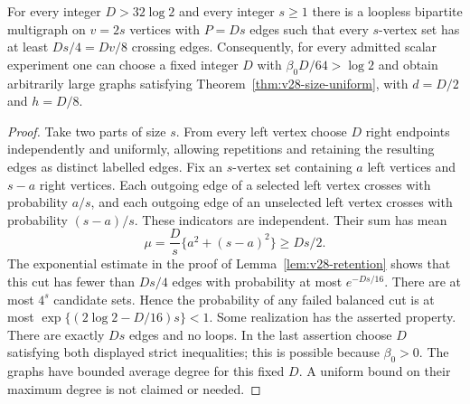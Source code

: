 \begin{proposition}
\label{prop:v28-graph-existence}
For every integer $D>32\log 2$ and every integer $s\ge1$ there is a
loopless bipartite multigraph on $v=2s$ vertices with $P=Ds$ edges
such that every $s$-vertex set has at least $Ds/4=Dv/8$ crossing
edges. Consequently, for every admitted scalar experiment one can
choose a fixed integer $D$ with $\beta_0D/64>\log 2$ and obtain
arbitrarily large graphs satisfying
Theorem~\ref{thm:v28-size-uniform}, with $d=D/2$ and $h=D/8$.
\end{proposition}
\begin{proof}
Take two parts of size $s$. From every left vertex choose $D$ right
endpoints independently and uniformly, allowing repetitions and
retaining the resulting edges as distinct labelled edges. Fix an
$s$-vertex set containing $a$ left vertices and $s-a$ right vertices.
Each outgoing edge of a selected left vertex crosses with probability
$a/s$, and each outgoing edge of an unselected left vertex crosses
with probability $(s-a)/s$. These indicators are independent. Their
sum has mean
\[
          \mu=\frac D s\{a^2+(s-a)^2\}\ge Ds/2.
\]
The exponential estimate in the proof of
Lemma~\ref{lem:v28-retention} shows that this cut has fewer than
$Ds/4$ edges with probability at most $e^{-Ds/16}$. There are at most
$4^s$ candidate sets. Hence the probability of any failed balanced cut
is at most $\exp\{(2\log 2-D/16)s\}<1$. Some realization has the
asserted property. There are exactly $Ds$ edges and no loops. In the
last assertion choose $D$ satisfying both displayed strict inequalities;
this is possible because $\beta_0>0$. The graphs have bounded average
degree for this fixed $D$. A uniform bound on their maximum degree is
not claimed or needed.
\end{proof}

